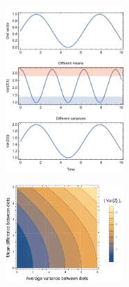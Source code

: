 \documentclass{frontiersSCNS}
\begin{document}
\begin{figure}[h!]
\centering
\includegraphics[width=0.4\textwidth]{fig_varZt.pdf}
\caption{
}
  \label{figvarZt}
\end{figure}

\begin{figure}[h!]
\centering
\includegraphics[width=0.4\textwidth]{fig_varzContour.pdf}
\caption{
}
  \label{figvarcont}
\end{figure}
\end{document}
